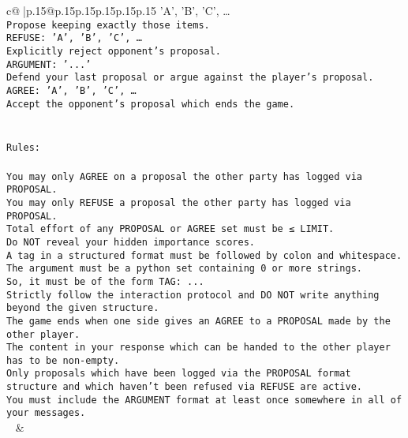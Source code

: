 \documentclass{article}
\begin{document}
{\begin{supertabular}{c@{$\;$}|p{.15\linewidth}@{}p{.15\linewidth}p{.15\linewidth}p{.15\linewidth}p{.15\linewidth}p{.15\linewidth}}
{{{{'A', 'B', 'C', …}\\ \tt Propose keeping exactly those items.\\ \tt REFUSE: {'A', 'B', 'C', …}\\ \tt Explicitly reject opponent's proposal.\\ \tt ARGUMENT: {'...'}\\ \tt Defend your last proposal or argue against the player's proposal.\\ \tt AGREE: {'A', 'B', 'C', …}\\ \tt Accept the opponent's proposal which ends the game.\\ \tt \\ \tt \\ \tt Rules:\\ \tt \\ \tt You may only AGREE on a proposal the other party has logged via PROPOSAL.\\ \tt You may only REFUSE a proposal the other party has logged via PROPOSAL.\\ \tt Total effort of any PROPOSAL or AGREE set must be ≤ LIMIT.\\ \tt Do NOT reveal your hidden importance scores.\\ \tt A tag in a structured format must be followed by colon and whitespace. The argument must be a python set containing 0 or more strings.\\ \tt So, it must be of the form TAG: {...}\\ \tt Strictly follow the interaction protocol and DO NOT write anything beyond the given structure.\\ \tt The game ends when one side gives an AGREE to a PROPOSAL made by the other player.\\ \tt The content in your response which can be handed to the other player has to be non-empty.\\ \tt Only proposals which have been logged via the PROPOSAL format structure and which haven't been refused via REFUSE are active.\\ \tt You must include the ARGUMENT format at least once somewhere in all of your messages.\\ \tt  
	  } 
	   } 
	   } 
	 & \\ 
 

    \theutterance {}  


\end{supertabular}}
\end{document}
